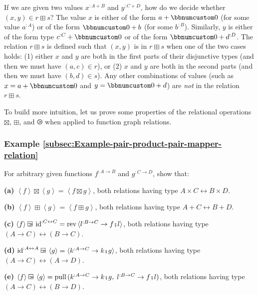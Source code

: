 If we are given two values $x^{:A+B}$ and $y^{:C+D}$, how do we
decide whether $(x,y)\in r\boxplus s$? The value $x$ is either of
the form $a+\bbnum 0$ (for some value $a^{:A}$) or of the form $\bbnum 0+b$
(for some $b^{:B}$). Similarly, $y$ is either of the form type $c^{:C}+\bbnum 0$
or of the form $\bbnum 0+d^{:D}$. The relation $r\boxplus s$ is
defined such that $(x,y)$ is in $r\boxplus s$ when one of the two
cases holds: (1) either $x$ and $y$ are both in the first parts
of their disjunctive types (and then we must have $(a,c)\in r$),
or (2) $x$ and $y$ are both in the second parts (and then we must
have $(b,d)\in s$). Any other combinations of values (such as $x=a+\bbnum 0$
and $y=\bbnum 0+d$) are \emph{not} in the relation $r\boxplus s$.

To build more intuition, let us prove some properties of the relational
operations $\boxtimes$, $\boxplus$, and $\ogreaterthan$ when applied
to function graph relations.

\subsubsection{Example \label{subsec:Example-pair-product-pair-mapper-relation}\ref{subsec:Example-pair-product-pair-mapper-relation}}

For arbitrary given functions $f^{:A\rightarrow B}$ and $g^{:C\rightarrow D}$,
show that:

\textbf{(a)} $\left<f\right>\boxtimes\left<g\right>=\left<f\boxtimes g\right>$,
both relations having type $A\times C\leftrightarrow B\times D$.

\textbf{(b)} $\left<f\right>\boxplus\left<g\right>=\left<f\boxplus g\right>$,
both relations having type $A+C\leftrightarrow B+D$.

\textbf{(c)} $\left<f\right>\ogreaterthan\text{id}^{:C\leftrightarrow C}=\text{rev}\,\langle l^{:B\rightarrow C}\rightarrow f\bef l\rangle$,
both relations having type $\left(A\rightarrow C\right)\leftrightarrow\left(B\rightarrow C\right)$.

\textbf{(d)} $\text{id}^{:A\leftrightarrow A}\ogreaterthan\left<g\right>=\langle k^{:A\rightarrow C}\rightarrow k\bef g\rangle$,
both relations having type $\left(A\rightarrow C\right)\leftrightarrow\left(A\rightarrow D\right)$.

\textbf{(e)} $\left<f\right>\ogreaterthan\left<g\right>=\text{pull}\,(k^{:A\rightarrow C}\rightarrow k\bef g,\;l^{:B\rightarrow C}\rightarrow f\bef l)$,
both relations having type $\left(A\rightarrow C\right)\leftrightarrow\left(B\rightarrow D\right)$.

